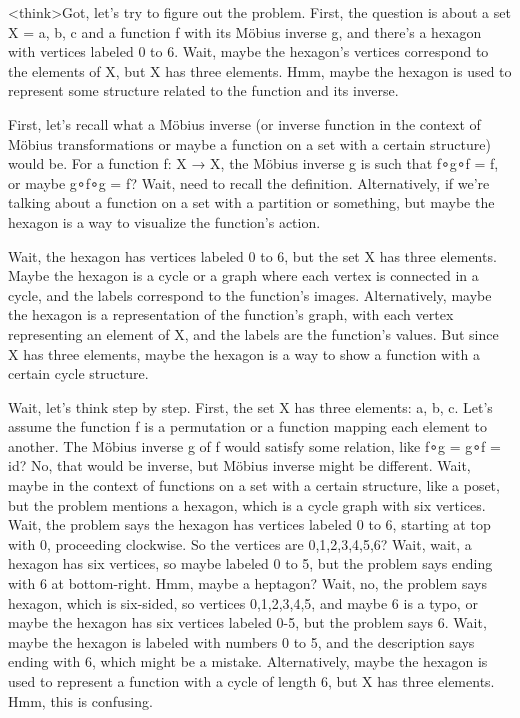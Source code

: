<think>Got, let's try to figure out the problem. First, the question is about a set X = {a, b, c} and a function f with its Möbius inverse g, and there's a hexagon with vertices labeled 0 to 6. Wait, maybe the hexagon's vertices correspond to the elements of X, but X has three elements. Hmm, maybe the hexagon is used to represent some structure related to the function and its inverse. 

First, let's recall what a Möbius inverse (or inverse function in the context of Möbius transformations or maybe a function on a set with a certain structure) would be. For a function f: X → X, the Möbius inverse g is such that f∘g∘f = f, or maybe g∘f∘g = f? Wait, need to recall the definition. Alternatively, if we're talking about a function on a set with a partition or something, but maybe the hexagon is a way to visualize the function's action. 

Wait, the hexagon has vertices labeled 0 to 6, but the set X has three elements. Maybe the hexagon is a cycle or a graph where each vertex is connected in a cycle, and the labels correspond to the function's images. Alternatively, maybe the hexagon is a representation of the function's graph, with each vertex representing an element of X, and the labels are the function's values. But since X has three elements, maybe the hexagon is a way to show a function with a certain cycle structure. 

Wait, let's think step by step. First, the set X has three elements: a, b, c. Let's assume the function f is a permutation or a function mapping each element to another. The Möbius inverse g of f would satisfy some relation, like f∘g = g∘f = id? No, that would be inverse, but Möbius inverse might be different. Wait, maybe in the context of functions on a set with a certain structure, like a poset, but the problem mentions a hexagon, which is a cycle graph with six vertices. Wait, the problem says the hexagon has vertices labeled 0 to 6, starting at top with 0, proceeding clockwise. So the vertices are 0,1,2,3,4,5,6? Wait, wait, a hexagon has six vertices, so maybe labeled 0 to 5, but the problem says ending with 6 at bottom-right. Hmm, maybe a heptagon? Wait, no, the problem says hexagon, which is six-sided, so vertices 0,1,2,3,4,5, and maybe 6 is a typo, or maybe the hexagon has six vertices labeled 0-5, but the problem says 6. Wait, maybe the hexagon is labeled with numbers 0 to 5, and the description says ending with 6, which might be a mistake. Alternatively, maybe the hexagon is used to represent a function with a cycle of length 6, but X has three elements. Hmm, this is confusing. 

